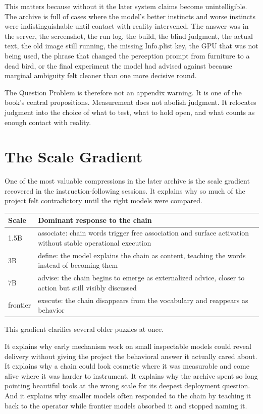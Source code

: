 \documentclass[11pt,oneside]{book}
\begin{document}
This matters because without it the later system claims become unintelligible. The archive is full of cases where the model's better instincts and worse instincts were indistinguishable until contact with reality intervened. The answer was in the server, the screenshot, the run log, the build, the blind judgment, the actual text, the old image still running, the missing Info.plist key, the GPU that was not being used, the phrase that changed the perception prompt from furniture to a dead bird, or the final experiment the model had advised against because marginal ambiguity felt cleaner than one more decisive round.

The Question Problem is therefore not an appendix warning. It is one of the book's central propositions. Measurement does not abolish judgment. It relocates judgment into the choice of what to test, what to hold open, and what counts as enough contact with reality.

\chapter{The Scale Gradient}
One of the most valuable compressions in the later archive is the scale gradient recovered in the instruction-following sessions. It explains why so much of the project felt contradictory until the right models were compared.

\begin{center}
\begin{tabular}{lp{}}
\toprule
Scale & Dominant response to the chain \\
\midrule
1.5B & associate: chain words trigger free association and surface activation without stable operational execution \\
3B & define: the model explains the chain as content, teaching the words instead of becoming them \\
7B & advise: the chain begins to emerge as externalized advice, closer to action but still visibly discussed \\
frontier & execute: the chain disappears from the vocabulary and reappears as behavior \\
\bottomrule
\end{tabular}
\end{center}

This gradient clarifies several older puzzles at once.

It explains why early mechanism work on small inspectable models could reveal delivery without giving the project the behavioral answer it actually cared about. It explains why a chain could look cosmetic where it was measurable and come alive where it was harder to instrument. It explains why the archive spent so long pointing beautiful tools at the wrong scale for its deepest deployment question. And it explains why smaller models often responded to the chain by teaching it back to the operator while frontier models absorbed it and stopped naming it.
\end{document}
